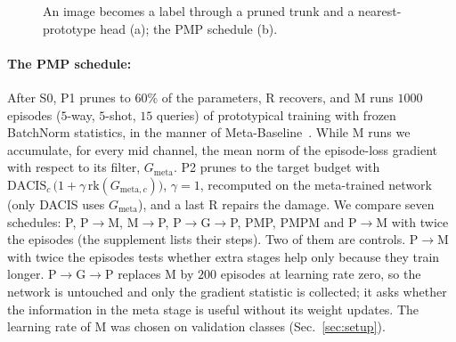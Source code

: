 \begin{figure}[t]
  \centering
  
  \caption{An image becomes a label through a pruned trunk and a nearest-prototype head (a); the PMP schedule (b).}
  \label{fig:overview}
\end{figure}

\paragraph{The PMP schedule:}
After S0, P1 prunes to $60\%$ of the parameters, R recovers, and M runs $1000$ episodes ($5$-way, $5$-shot, $15$ queries) of prototypical training with frozen BatchNorm statistics, in the manner of Meta-Baseline~\cite{chen2021metabaseline}. While M runs we accumulate, for every mid channel, the mean norm of the episode-loss gradient with respect to its filter, $G_{\mathrm{meta}}$. P2 prunes to the target budget with
$\mathrm{DACIS}_c\,\bigl(1+\gamma\,\mathrm{rk}(G_{\mathrm{meta},c})\bigr)$, $\gamma{=}1$, recomputed on the meta-trained network (only DACIS uses $G_{\mathrm{meta}}$), and a last R repairs the damage. We compare seven schedules: P, P$\to$M, M$\to$P, P$\to$G$\to$P, PMP, PMPM and P$\to$M with twice the episodes (the supplement lists their steps). Two of them are controls. P$\to$M with twice the episodes tests whether extra stages help only because they train longer. P$\to$G$\to$P replaces M by $200$ episodes at learning rate zero, so the network is untouched and only the gradient statistic is collected; it asks whether the information in the meta stage is useful without its weight updates. The learning rate of M was chosen on validation classes (Sec.~\ref{sec:setup}).

